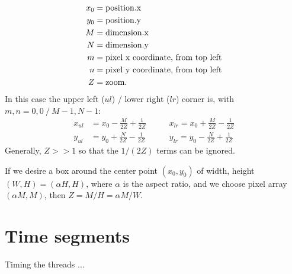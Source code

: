 \documentclass[10pt]{article} %
\begin{document}
\begin{align*}
x_0 &= \hbox{\rm position.x}\\
y_0 &= \hbox{\rm position.y}\\
M &= \hbox{\rm dimension.x}\\
N &= \hbox{\rm dimension.y}\\
m &= \hbox{\rm pixel x coordinate, from top left}\\
n &= \hbox{\rm pixel y coordinate, from top left}\\
Z &= \hbox{\rm zoom.}
\end{align*}
In this case the upper left ($ul$) / lower right ($lr$) corner is, with $m,n=0,0\ /\ M-1, N-1$:
\begin{align}
x_{ul} &= x_0 - \frac{M}{2Z} + \frac{1}{2Z} \qquad &x_{lr} = x_0 + \frac{M}{2Z} - \frac{1}{2Z} \\
y_{ul} &= y_0 + \frac{N}{2Z} - \frac{1}{2Z} \qquad &y_{lr} = y_0 - \frac{N}{2Z} + \frac{1}{2Z}
\end{align}
Generally, $Z>>1$ so that the $1/(2Z)$ terms can be ignored.

If we desire a box around the center point $(x_0,y_0)$ of width, height $(W,H) = (\alpha H, H)$, where $\alpha$ is the aspect ratio, and we choose pixel array $(\alpha M, M)$, then $Z= M / H = \alpha M / W$. 
\section{Time segments}
Timing the threads ... 
\end{document}
